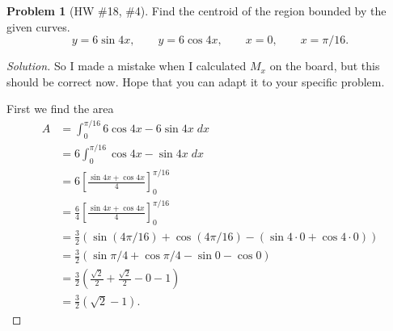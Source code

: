 \documentclass[10pt]{article}
\theoremstyle{plain}
\theoremstyle{definition}
\newtheorem{problem}[exercise]{Problem}
\theoremstyle{remark}
\begin{document}
\author{TA: \href{mailto:\authoremail}{\documentauthor}}
\title{\documenttitle}
\date{\today}
\maketitle
\begin{problem}[HW \#18, \#4]
Find the centroid of the region bounded by the given curves.
\[
y=6\sin 4x,\qquad y=6\cos 4x,\qquad x=0,\qquad x=\pi/16.
\]
\end{problem}
\begin{proof}[Solution]
So I made a mistake when I calculated $M_x$ on the board, but this should
be correct now. Hope that you can adapt it to your specific problem.

First we find the area
\begin{align*}
A&=\int_0^{\pi/16}6\cos 4x-6\sin 4x\;dx\\
 &=6\int_0^{\pi/16}\cos 4x-\sin 4x\;dx\\
 &=6\left[\frac{\sin 4x+\cos 4x}{4}\right]_0^{\pi/16}\\
 &=\frac{6}{4}\left[\frac{\sin 4x+\cos 4x}{4}\right]_0^{\pi/16}\\
 &=\frac{3}{2}\left(\sin \left(4\pi/16\right)+
   \cos\left(4\pi/16\right)-(\sin 4\cdot 0+\cos 4\cdot
   0)\right)\\
 &=\frac{3}{2}\left(\sin \pi/4+\cos \pi/4-\sin 0 -\cos 0\right)\\
 &=\frac{3}{2}\left(\frac{\sqrt{2}}{2}+\frac{\sqrt{2}}{2}-0-1\right)\\
 &=\boxed{\frac{3}{2}\left(\sqrt{2}-1\right).}
\end{align*}


\end{proof}
\end{document}
